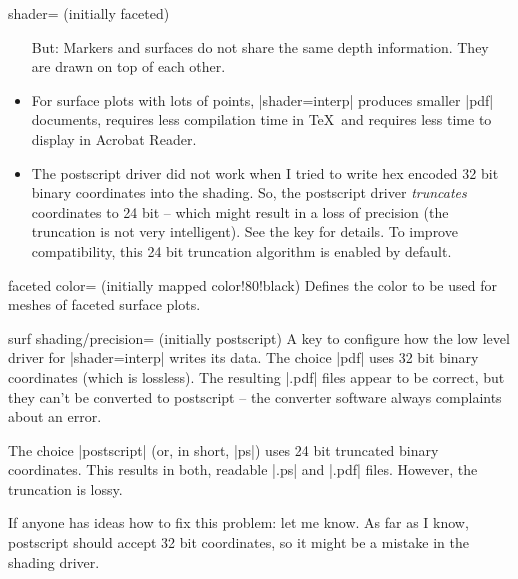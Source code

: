 \begin{pgfplotskey}{shader= (initially faceted)}
\begin{itemize}
		But: Markers and surfaces do not share the same depth information. They are drawn on top of each other.

		\item For surface plots with lots of points, |shader=interp| produces smaller |pdf| documents, requires less compilation time in \TeX\ and requires less time to display in Acrobat Reader.

		\item The postscript driver did not work when I tried to write hex encoded 32 bit binary coordinates into the shading. So, the postscript driver \emph{truncates} coordinates to 24 bit -- which might result in a loss of precision (the truncation is not very intelligent). See the  key for details. To improve compatibility, this 24 bit truncation algorithm is enabled by default.
	\end{itemize}

\pgfplotsexpensiveexample
\begin{codeexample}[]
\end{codeexample}

\pgfplotsexpensiveexample
\begin{codeexample}[]
\end{codeexample}
\end{pgfplotskey}

\begin{pgfplotskey}{faceted color= (initially mapped color!80!black)}
	Defines the color to be used for meshes of faceted surface plots.
\end{pgfplotskey}

\begin{pgfplotskey}{surf shading/precision= (initially postscript)}
	A key to configure how the low level driver for |shader=interp| writes its data. The choice |pdf| uses 32 bit binary coordinates (which is lossless). The resulting |.pdf| files appear to be correct, but they can't be converted to postscript -- the converter software always complaints about an error. 

	The choice |postscript| (or, in short, |ps|) uses 24 bit truncated binary coordinates. This results in both, readable |.ps| and |.pdf| files. However, the truncation is lossy.

	If anyone has ideas how to fix this problem: let me know. As far as I know, postscript should accept 32 bit coordinates, so it might be a mistake in the shading driver.
\end{pgfplotskey}

